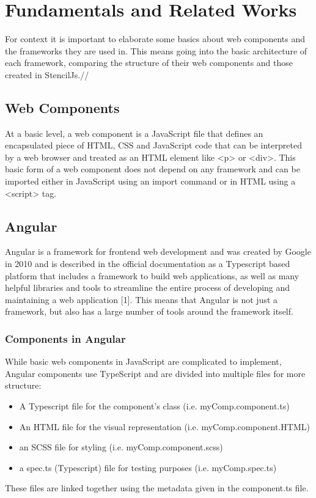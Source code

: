 \chapter{Fundamentals and Related Works}
\label{cha:Fundamentals}
For context it is important to elaborate some basics about web components and the frameworks they are used in. This means going into the basic architecture of each framework, comparing the structure of their web components and those created in StencilJs.//

\section{Web Components}
At a basic level, a web component is a JavaScript file that defines an encapsulated piece of HTML, CSS and JavaScript code that can be interpreted by a web browser and treated as an HTML element like <p> or <div>. This basic form of a web component does not depend on any framework and can be imported either in JavaScript using an import command or in HTML using a <script> tag.

\section{Angular}
Angular is a framework for frontend web development and was created by Google in 2010 and is described in the official documentation as a Typescript based platform that includes a framework to build web applications, as well as many helpful libraries and tools to streamline the entire process of developing and maintaining a web application [1]. This means that Angular is not just a framework, but also has a large number of tools around the framework itself.

\subsection{Components in Angular}
While basic web components in JavaScript are complicated to implement, Angular components use TypeScript and are divided into multiple files for more structure:

\begin{itemize}
\item A Typescript file for the component’s class (i.e. myComp.component.ts)
\item An HTML file for the visual representation (i.e. myComp.component.HTML)
\item an SCSS file for styling (i.e. myComp.component.scss)
\item a spec.ts (Typescript) file for testing purposes (i.e. myComp.spec.ts)
\end{itemize}
These files are linked together using the metadata given in the component.ts file.

